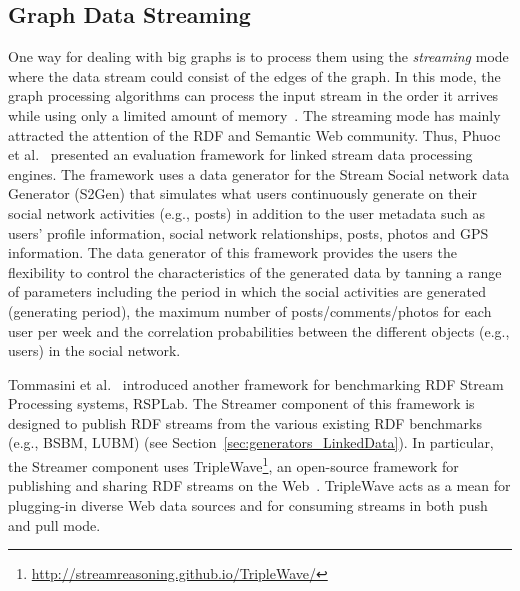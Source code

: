 \subsection{Graph Data Streaming}
\label{sec:generators_streaming}
One way for dealing with big graphs is to process them using the \emph{streaming} mode where the data stream could consist of the edges of the graph. In this mode, the graph processing algorithms can process the input stream in the order it arrives while using only a limited amount of memory~\cite{mcgregor2014graph}. The streaming mode has mainly  attracted the attention of the RDF and Semantic Web community. Thus, Phuoc et al.~\cite{le2012linked} presented an evaluation framework for linked stream data processing engines. The framework uses a data generator for the Stream Social network data Generator (S2Gen) that simulates what users continuously generate on their social network activities (e.g., posts) in addition to the  user metadata such as users' profile information, social network relationships, posts, photos and GPS information. The data generator of this framework provides the users the flexibility to control the characteristics of the generated data by tanning a range of parameters including the period in which the social activities are generated (generating period), the maximum number of posts/comments/photos for each user per week and the correlation probabilities between the different objects (e.g., users) in the social network.

Tommasini et al.~\cite{tommasini2017rsplab} introduced another framework for benchmarking RDF Stream Processing systems, RSPLab. The Streamer component of this framework is designed to publish RDF streams from the various existing RDF benchmarks (e.g., BSBM, LUBM) (see Section~\ref{sec:generators_LinkedData}). In particular, the Streamer  component uses TripleWave\footnote{\url{http://streamreasoning.github.io/TripleWave/}}, an open-source framework for publishing and sharing RDF streams on the Web~\cite{mauri2016triplewave}.   TripleWave acts as a mean for plugging-in diverse Web data sources and for consuming streams in both push and pull mode.
